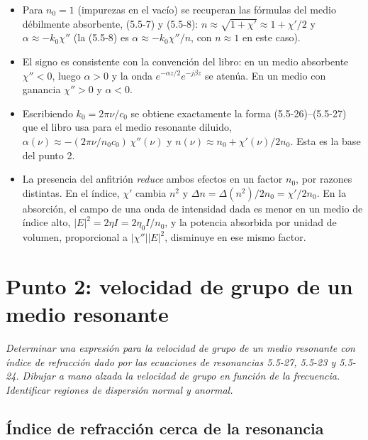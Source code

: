 \documentclass{article}
\begin{document}
\begin{itemize}
\item Para $n_0=1$ (impurezas en el vacío) se recuperan las fórmulas del medio débilmente
absorbente, (5.5-7) y (5.5-8): $n\approx\sqrt{1+\chi'}\approx1+\chi'/2$ y
$\alpha\approx-k_0\chi''$ (la (5.5-8) es $\alpha\approx-k_0\chi''/n$, con $n\approx1$ en este caso).
\item El signo es consistente con la convención del libro: en un medio absorbente $\chi''<0$,
luego $\alpha>0$ y la onda $e^{-\alpha z/2}e^{-j\beta z}$ se atenúa. En un medio con ganancia
$\chi''>0$ y $\alpha<0$.
\item Escribiendo $k_0=2\pi\nu/c_0$ se obtiene exactamente la forma (5.5-26)--(5.5-27) que el
libro usa para el medio resonante diluido,
$\alpha(\nu)\approx-(2\pi\nu/n_0c_0)\,\chi''(\nu)$ y $n(\nu)\approx n_0+\chi'(\nu)/2n_0$.
Esta es la base del punto 2.
\item La presencia del anfitrión \emph{reduce} ambos efectos en un factor $n_0$, por razones
distintas. En el índice, $\chi'$ cambia $n^2$ y $\Delta n=\Delta(n^2)/2n_0=\chi'/2n_0$. En la
absorción, el campo de una onda de intensidad dada es menor en un medio de índice alto,
$|E|^2=2\eta I=2\eta_0I/n_0$, y la potencia absorbida por unidad de volumen, proporcional a
$|\chi''||E|^2$, disminuye en ese mismo factor.
\end{itemize}

\section{Punto 2: velocidad de grupo de un medio resonante}

\emph{Determinar una expresión para la velocidad de grupo de un medio resonante con índice de
refracción dado por las ecuaciones de resonancias 5.5-27, 5.5-23 y 5.5-24. Dibujar a mano alzada la
velocidad de grupo en función de la frecuencia. Identificar regiones de dispersión normal y
anormal.}

\subsection*{Índice de refracción cerca de la resonancia}
\end{document}
